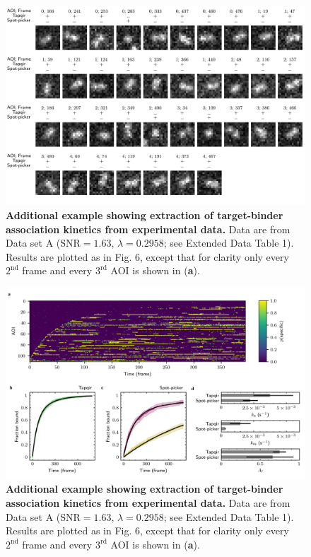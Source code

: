 \begin{figure}[t]
\centering
\includegraphics[width=\textwidth]{extended-data/figure5.png}
\caption{\textbf{Additional example showing extraction of target-binder association kinetics from experimental data.} Data are from Data set A ($\mathrm{SNR} = 1.63$, $\lambda = 0.2958$; see Extended Data Table 1).  Results are plotted as in Fig. 6, except that for clarity only every $2^\mathrm{nd}$ frame and every $3^\mathrm{rd}$ AOI is shown in (\textbf{a}).}
\label{fig:rpb1snap549}
\end{figure}
\pagebreak

\begin{figure}[t]
\centering
\includegraphics[width=\textwidth]{extended-data/figure6.png}
\caption{\textbf{Additional example showing extraction of target-binder association kinetics from experimental data.} Data are from Data set A ($\mathrm{SNR} = 1.63$, $\lambda = 0.2958$; see Extended Data Table 1).  Results are plotted as in Fig. 6, except that for clarity only every $2^\mathrm{nd}$ frame and every $3^\mathrm{rd}$ AOI is shown in (\textbf{a}).}
\label{fig:rpb1snap549}
\end{figure}
\pagebreak

